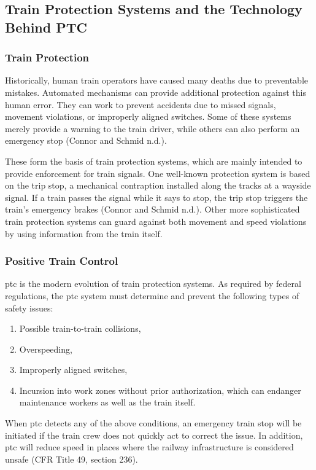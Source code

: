 \documentclass[11pt, titlepage]{article}
\begin{document}
\subsection{Train Protection Systems and the Technology Behind PTC}

\subsubsection{Train Protection}

Historically, human train operators have caused many deaths due to preventable
mistakes. Automated mechanisms can provide additional protection against this human
error. They can work to prevent accidents due to missed signals, movement
violations, or improperly aligned switches. Some of these systems merely provide a
warning to the train driver, while others can also perform an emergency stop
(Connor and Schmid n.d.).

These form the basis of train protection systems, which are mainly intended to
provide enforcement for train signals. One well-known protection system is based on
the trip stop, a mechanical contraption installed along the tracks at a wayside
signal. If a train passes the signal while it says to stop, the trip stop triggers
the train’s emergency brakes (Connor and Schmid n.d.). Other more sophisticated
train protection systems can guard against both movement and speed violations by
using information from the train itself.

\subsubsection{Positive Train Control}

\gls{ptc} is the modern evolution of train protection systems. As required by
federal regulations, the \gls{ptc} system must determine and prevent the following
types of safety issues:
\begin{enumerate}
    \item Possible train-to-train collisions,
    \item Overspeeding,
    \item Improperly aligned switches,
    \item Incursion into work zones without prior authorization, which can endanger
    maintenance workers as well as the train itself.
\end{enumerate}
When \gls{ptc} detects any of the above conditions, an emergency train stop will be
initiated if the train crew does not quickly act to correct the issue. In addition,
\gls{ptc} will reduce speed in places where the railway infrastructure is
considered unsafe (CFR Title 49, section 236).
\end{document}
